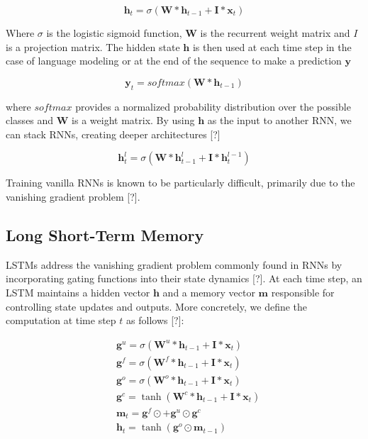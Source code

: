 \documentclass{article}
\begin{document}
\begin{equation}
	\boldsymbol h_t = \sigma(\boldsymbol W * \boldsymbol h_{t-1} + \boldsymbol I * \boldsymbol x_t) \nonumber
\end{equation}

Where $\sigma$ is the logistic sigmoid function, $\boldsymbol W$ is the recurrent weight matrix and $I$ is a projection matrix. The hidden state $\boldsymbol h$ is then used at each time step in the case of language modeling or at the end of the sequence to make a prediction $\boldsymbol y$

\begin{equation}
	\boldsymbol y_t = softmax(\boldsymbol W * \boldsymbol h_{t-1}) \nonumber
\end{equation}

where $softmax$ provides a normalized probability distribution over the possible classes and $\boldsymbol W$ is a weight matrix. By using $\boldsymbol h$ as the input to another RNN, we can stack RNNs, creating deeper architectures [?]

\begin{equation}
	\boldsymbol h_t^{l} = \sigma(\boldsymbol W * \boldsymbol h_{t-1}^{l} + \boldsymbol I * \boldsymbol h_t^{l-1}) \nonumber
\end{equation}

Training vanilla RNNs is known to be particularly difficult, primarily due to the vanishing gradient problem [?].

\subsection{Long Short-Term Memory}
LSTMs address the vanishing gradient problem commonly found in RNNs by incorporating gating functions into their state dynamics [?]. At each time step, an LSTM maintains a hidden vector $\boldsymbol h$ and a memory vector $\boldsymbol m$  responsible for controlling state updates and outputs. More concretely, we define the computation at time step $t$ as follows [?]:

\begin{equation}
	\begin{split}
		& \boldsymbol g^u = \sigma(\boldsymbol W^u * \boldsymbol h_{t-1} + \boldsymbol I * \boldsymbol x_t) \\
		& \boldsymbol g^f = \sigma(\boldsymbol W^f * \boldsymbol h_{t-1} + \boldsymbol I * \boldsymbol x_t) \\
		& \boldsymbol g^o = \sigma(\boldsymbol W^o * \boldsymbol h_{t-1} + \boldsymbol I * \boldsymbol x_t) \\
		& \boldsymbol g^c = \tanh(\boldsymbol W^c * \boldsymbol h_{t-1} + \boldsymbol I * \boldsymbol x_t) \\
		& \boldsymbol m_t = \boldsymbol g^f \odot \boldsymbol +  \boldsymbol g^u \odot \boldsymbol g^c \\
		& \boldsymbol h_t = \tanh(\boldsymbol g^o \odot \boldsymbol m_{t-1}) \nonumber
	\end{split}
\end{equation}
\end{document}
